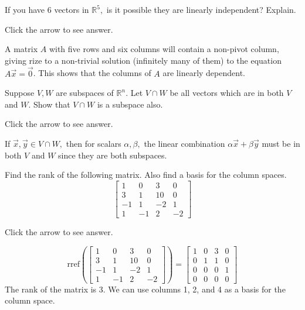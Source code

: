 \documentclass{ximera}
\begin{document}
\begin{problem}\label{prb:5.25} If you have $6$ vectors in $\mathbb{R}^{5},$ is it possible they are
linearly independent? Explain.

Click the arrow to see answer.  
\begin{expandable}
A matrix $A$ with five rows and six columns will contain a non-pivot column, giving rize to a non-trivial solution (infinitely many of them) to the equation $A\vec{x}=\vec{0}$.  This shows that the columns of $A$ are linearly dependent.
\end{expandable}
\end{problem}

\begin{problem}\label{prb:5.27} Suppose $V, W$ are subspaces of $\mathbb{R}^{n}.$ Let $V\cap W$
be all vectors which are in both $V$ and $W$. Show that $V \cap W$ is a subspace also.

Click the arrow to see answer.  
\begin{expandable}
If $\vec{x}, \vec{y}\in V\cap W,$ then for scalars $\alpha
,\beta ,$ the linear combination $\alpha \vec{x}+\beta \vec{y}$ must
be in both $V$ and $W$ since they are both subspaces.
\end{expandable}
\end{problem}

\begin{problem}\label{prb:5.37} Find the rank of the following matrix. Also find a basis for the column spaces.
\begin{equation*}
\left[
\begin{array}{rrrr}
1 & 0 & 3 & 0 \\
3 & 1 & 10 & 0 \\
-1 & 1 & -2 & 1 \\
1 & -1 & 2 & -2
\end{array}
\right]
\end{equation*}

Click the arrow to see answer.  

\begin{expandable}
$$\text{rref}\left(\begin{bmatrix}
1 & 0 & 3 & 0 \\
3 & 1 & 10 & 0 \\
-1 & 1 & -2 & 1 \\
1 & -1 & 2 & -2
\end{bmatrix}\right)=\begin{bmatrix}1 &0 &3 &0\\
 0& 1& 1& 0\\
 0& 0& 0& 1\\
 0& 0& 0& 0\end{bmatrix}$$
 The rank of the matrix is 3.  We can use columns 1, 2, and 4 as a basis for the column space.
\end{expandable}
\end{problem}
\end{document}
